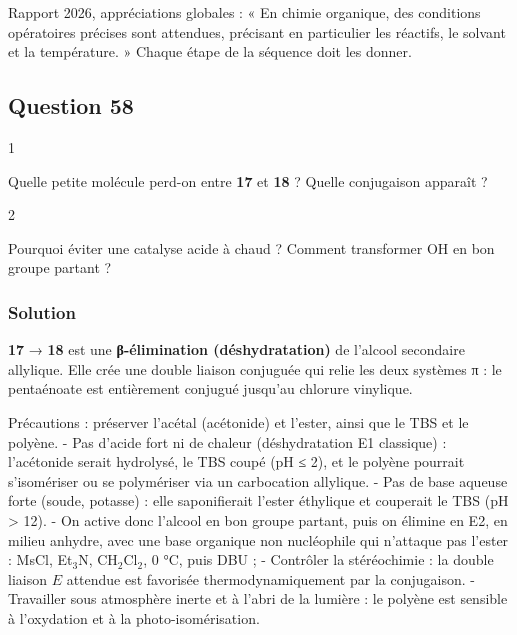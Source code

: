 \documentclass[11pt,a4paper]{article}
\begin{document}
\begin{jury}

Rapport 2026, appréciations globales : « En chimie organique, des conditions opératoires précises sont attendues, précisant en particulier les réactifs, le solvant et la température. » Chaque étape de la séquence doit les donner.

\end{jury}

\hypertarget{question-58}{%
\subsection{Question 58}\label{question-58}}

\begin{indication}{1}

Quelle petite molécule perd-on entre \textbf{17} et \textbf{18} ? Quelle conjugaison apparaît ?

\end{indication}

\begin{indication}{2}

Pourquoi éviter une catalyse acide à chaud ? Comment transformer OH en bon groupe partant ?

\end{indication}

\hypertarget{solution-57}{%
\subsubsection{Solution}\label{solution-57}}

\textbf{17} → \textbf{18} est une \textbf{β-élimination (déshydratation)} de l'alcool secondaire allylique. Elle crée une double liaison conjuguée qui relie les deux systèmes π : le pentaénoate est entièrement conjugué jusqu'au chlorure vinylique.

Précautions : préserver l'acétal (acétonide) et l'ester, ainsi que le TBS et le polyène.
- Pas d'acide fort ni de chaleur (déshydratation E1 classique) : l'acétonide serait hydrolysé, le TBS coupé (pH ≤ 2), et le polyène pourrait s'isomériser ou se polymériser via un carbocation allylique.
- Pas de base aqueuse forte (soude, potasse) : elle saponifierait l'ester éthylique et couperait le TBS (pH \textgreater{} 12).
- On active donc l'alcool en bon groupe partant, puis on élimine en E2, en milieu anhydre, avec une base organique non nucléophile qui n'attaque pas l'ester : MsCl, Et\(_3\)N, CH\(_2\)Cl\(_2\), 0 °C, puis DBU ;
- Contrôler la stéréochimie : la double liaison \(E\) attendue est favorisée thermodynamiquement par la conjugaison.
- Travailler sous atmosphère inerte et à l'abri de la lumière : le polyène est sensible à l'oxydation et à la photo-isomérisation.
\end{document}
